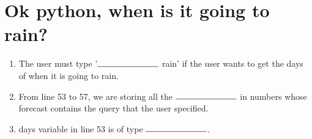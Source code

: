 \documentclass[11pt]{article}
\begin{document}
\noindent\makebox[\linewidth]{\rule{\paperwidth}{0.4pt}}
\section{Ok python, when is it going to rain?}
\begin{enumerate}
    \item The user must type '$\rule{2.5cm}{0.15mm}$ rain' if the user wants to get the days of when it is going to rain.
    \item From line 53 to 57, we are storing all the $\rule{2.5cm}{0.15mm}$ in numbers whose forecast contains the query that the user specified.
    \item days variable in line 53 is of type $\rule{2.5cm}{0.15mm}$.
\end{enumerate}
\end{document}
